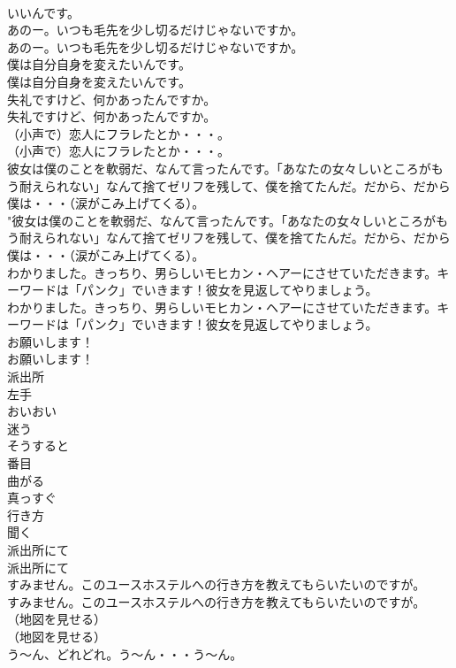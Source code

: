 \documentclass[8pt]{extreport}
\begin{document}
\begin{CJK}{UTF8}{min}
\\	いいんです。 
\\	あのー。いつも毛先を少し切るだけじゃないですか。	
\\	あのー。いつも毛先を少し切るだけじゃないですか。 
\\	僕は自分自身を変えたいんです。	
\\	僕は自分自身を変えたいんです。 
\\	失礼ですけど、何かあったんですか。	
\\	失礼ですけど、何かあったんですか。 
\\	（小声で）恋人にフラレたとか・・・。	
\\	（小声で）恋人にフラレたとか・・・。 
\\	彼女は僕のことを軟弱だ、なんて言ったんです。「あなたの女々しいところがもう耐えられない」なんて捨てゼリフを残して、僕を捨てたんだ。だから、だから僕は・・・（涙がこみ上げてくる）。	
\\	"彼女は僕のことを軟弱だ、なんて言ったんです。「あなたの女々しいところがもう耐えられない」なんて捨てゼリフを残して、僕を捨てたんだ。だから、だから僕は・・・（涙がこみ上げてくる）。 
\\	わかりました。きっちり、男らしいモヒカン・ヘアーにさせていただきます。キーワードは「パンク」でいきます！彼女を見返してやりましょう。	
\\	わかりました。きっちり、男らしいモヒカン・ヘアーにさせていただきます。キーワードは「パンク」でいきます！彼女を見返してやりましょう。 
\\	お願いします！	
\\	お願いします！ 
\\	派出所
\\	左手
\\	おいおい
\\	迷う
\\	そうすると
\\	番目
\\	曲がる
\\	真っすぐ
\\	行き方
\\	聞く
\\	派出所にて	
\\	派出所にて 
\\	すみません。このユースホステルへの行き方を教えてもらいたいのですが。	
\\	すみません。このユースホステルへの行き方を教えてもらいたいのですが。 
\\	（地図を見せる）	
\\	（地図を見せる） 
\\	う〜ん、どれどれ。う〜ん・・・う〜ん。	

\end{CJK}
\end{document}
